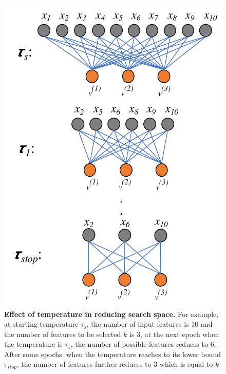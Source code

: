 \documentclass{bioinfo}
\begin{document}
\begin{figure}[h!]
    \centering
    \includegraphics[scale=0.5]{fig/temp-change.pdf}
    \caption{\textbf{Effect of temperature in reducing search space.} For example, at starting temperature $\tau_s$, the number of input features is 10 and the number of features to be selected $k$ is 3, at the next epoch when the temperature is $\tau_1$, the number of possible features reduces to 6. After some epochs, when the temperature reaches to its lower bound $\tau_{stop}$, the number of features further reduces to 3 which is equal to $k$}
    \label{fig:temp-change}
\end{figure}
\end{document}
